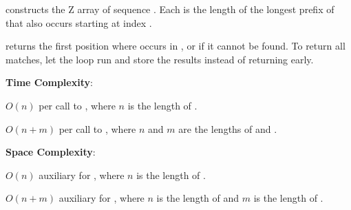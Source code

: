 \begin{compactitem}
  \item {} constructs the Z array of sequence . Each  is the length of the longest prefix of  that also occurs starting at index .
  \item {} returns the first position where  occurs in , or  if it cannot be found. To return all matches, let the loop run and store the results instead of returning early.
\end{compactitem}

\textbf{Time Complexity}:
\begin{compactitem}
  \item $O(n)$ per call to , where $n$ is the length of .
  \item $O(n + m)$ per call to , where $n$ and $m$ are the lengths of  and .
\end{compactitem}

\textbf{Space Complexity}:
\begin{compactitem}
  \item $O(n)$ auxiliary for , where $n$ is the length of .
  \item $O(n + m)$ auxiliary for , where $n$ is the length of  and $m$ is the length of .
\end{compactitem}

